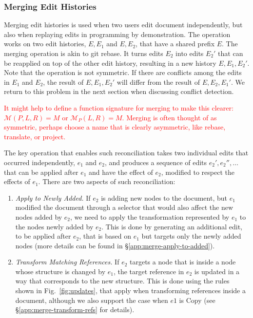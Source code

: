 \documentclass[sigconf,anonymous,screen]{acmart}
\newcommand{\ident}[1]{{\sffamily #1}}
\newcommand{\note}[1]{\textcolor{red}{#1}}
\begin{document}
\subsubsection*{Merging Edit Histories}
Merging edit histories is used when two users edit document independently, but also
when replaying edits in programming by demonstration. The
operation works on two edit histories, $E, E_1$ and $E, E_2$, that have a shared prefix $E$.
The merging operation is akin to git rebase. It turns edits $E_2$ into edits $E_2'$ that
can be reapplied on top of the other edit history, resulting in a new history $E, E_1, E_2'$.
Note that the operation is not symmetric. If there are conflicts among the edits in $E_1$ and
$E_2$, the result of $E, E_1, E_2'$ will differ from the result of $E, E_2, E_1'$.
We return to this problem in the next section when discussing conflict detection.

\note{It might help to define a function signature for merging to make this clearer: $\mathcal{M}(P, L, R) = M$ or $\mathcal{M}_P(L, R) = M$.}
\note{Merging is often thought of as symmetric, perhaps choose a name that is clearly asymmetric, like rebase, translate, or project.}

The key operation that enables such reconciliation takes two individual edits that occurred
independently, $e_1$ and $e_2$, and produces a sequence of edits $e_2', e_2'', \ldots$ that
can be applied after $e_1$ and have the effect of $e_2$, modified to respect the effects of $e_1$.
There are two aspects of such reconciliation:

\begin{enumerate}
\item \emph{Apply to Newly Added.} If $e_2$ is adding new nodes to the document, but
  $e_1$ modified the document through a selector that would also affect the new nodes added by $e_2$,
  we need to apply the transformation represented by $e_1$ to the nodes newly added by $e_2$.
  This is done by generating an additional edit, to be applied after $e_2$, that is based on
  $e_1$ but targets only the newly added nodes (more details can be found in \S\ref{app:merge-apply-to-added}).

\item \emph{Transform Matching References.} If $e_2$ targets a node that is inside a node
  whose structure is changed by $e_1$, the target reference in $e_2$ is updated in a way that
  corresponds to the new structure. This is done using the rules shown in Fig.~\ref{fig:updates},
  that apply when transforming references inside a document, although we also support the case
  when $e1$ is \ident{Copy} (see \S\ref{app:merge-transform-refs} for details).
\end{enumerate}
\end{document}

